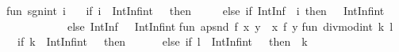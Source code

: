 \begin{isabellebody}
\begin{isamarkuptext}
\isanewline
fun\ sgn{}int\ i\ {}\isanewline
\ \ {}if\ {}{}i\ {}\ IntInf{}int{}\ {}\ {}{}\ then\ {}\isanewline
\ \ \ \ else\ {}if\ IntInf{}{}\ {}{}{}\ i{}\ then\ {}{}\ {}\ IntInf{}int{}\isanewline
\ \ \ \ \ \ \ \ \ \ \ else\ IntInf{}{}\ {}{}\ {}\ IntInf{}int{}{}{}{}\isanewline
\isanewline
fun\ apsnd\ f\ {}x{}\ y{}\ {}\ {}x{}\ f\ y{}{}\isanewline
\isanewline
fun\ divmod{}int\ k\ l\ {}\isanewline
\ \ {}if\ {}{}k\ {}\ IntInf{}int{}\ {}\ {}{}\ then\ {}{}{}\ {}{}\isanewline
\ \ \ \ else\ {}if\ {}{}l\ {}\ IntInf{}int{}\ {}\ {}{}\ then\ {}{}{}\ k{}\isanewline

\end{isamarkuptext}
\end{isabellebody}

